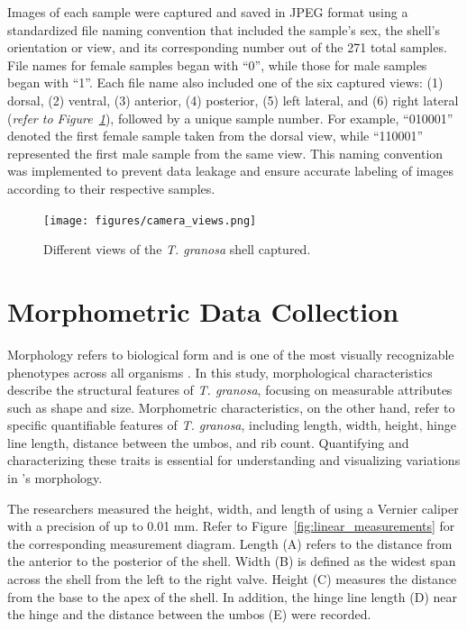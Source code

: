 Images of each sample were captured and saved in JPEG format using a standardized file naming convention that included the sample's sex, the shell's orientation or view, and its corresponding number out of the 271 total samples. File names for female \Tgranosa samples began with “0”, while those for male samples began with “1”. Each file name also included one of the six captured views: (1) dorsal, (2) ventral, (3) anterior, (4) posterior, (5) left lateral, and (6) right lateral (\textit{refer to Figure~\ref{fig:granosa_views}}), followed by a unique sample number. For example, “010001” denoted the first female sample taken from the dorsal view, while “110001” represented the first male sample from the same view. This naming convention was implemented to prevent data leakage and ensure accurate labeling of images according to their respective samples.

\begin{figure}[!htbp]
	\centering
	\texttt{[image: figures/camera\_views.png]}
	\caption{Different views of the \textit{T. granosa} shell captured.}
	\label{fig:granosa_views}
\end{figure}

\section{Morphometric Data Collection}
\label{sec:morphochar}

Morphology refers to biological form and is one of the most visually recognizable phenotypes across all organisms \cite{tsutsumi2023}. In this study, morphological characteristics describe the structural features of \textit{T. granosa}, focusing on measurable attributes such as shape and size. Morphometric characteristics, on the other hand, refer to specific quantifiable features of \textit{T. granosa}, including length, width, height, hinge line length, distance between the umbos, and rib count. Quantifying and characterizing these traits is essential for understanding and visualizing variations in \Tgranosa's morphology.

The researchers measured the height, width, and length of \Tgranosa using a Vernier caliper with a precision of up to 0.01 mm. Refer to Figure~\ref{fig:linear_measurements} for the corresponding measurement diagram. Length (A) refers to the distance from the anterior to the posterior of the shell. Width (B) is defined as the widest span across the shell from the left to the right valve. Height (C) measures the distance from the base to the apex of the shell. In addition, the hinge line length (D) near the hinge and the distance between the umbos (E) were recorded.

